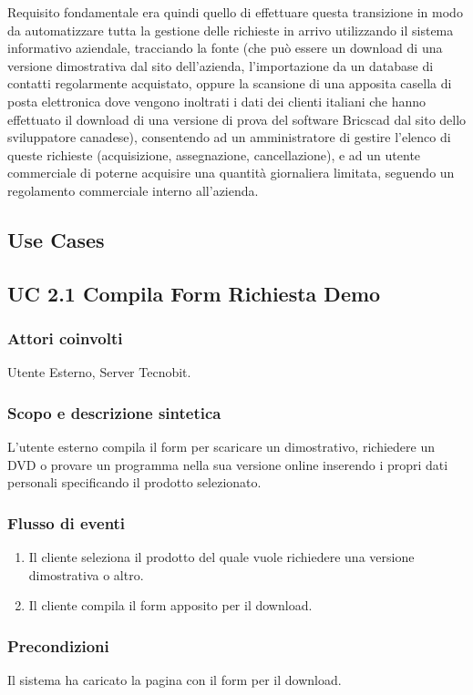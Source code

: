 \noindent
Requisito fondamentale era quindi quello di effettuare questa transizione in modo da automatizzare tutta la gestione delle richieste in arrivo utilizzando il sistema informativo aziendale, tracciando la fonte (che pu\`o essere un download di una versione dimostrativa dal sito dell'azienda, l'importazione da un database di contatti regolarmente acquistato, oppure la scansione di una apposita casella di posta elettronica dove vengono inoltrati i dati dei clienti italiani che hanno effettuato il download di una versione di prova del software Bricscad dal sito dello sviluppatore canadese), consentendo ad un amministratore di gestire l'elenco di queste richieste (acquisizione, assegnazione, cancellazione), e ad un utente commerciale di poterne acquisire una quantit\`a giornaliera limitata, seguendo un regolamento commerciale interno all'azienda.
\subsection{Use Cases}

\subsection*{UC 2.1 Compila Form Richiesta Demo}
\subsubsection*{Attori coinvolti} Utente Esterno, Server Tecnobit.
\subsubsection*{Scopo e descrizione sintetica}
L'utente esterno compila il form per scaricare un dimostrativo, richiedere un DVD o provare un programma nella sua versione online inserendo i propri dati personali specificando il prodotto selezionato.
\subsubsection*{Flusso di eventi}
\begin{enumerate}
\item Il cliente seleziona il prodotto del quale vuole richiedere una versione dimostrativa o altro.
\item Il cliente compila il form apposito per il download.
\end{enumerate}
\subsubsection*{Precondizioni} Il sistema ha caricato la pagina con il form per il download.
